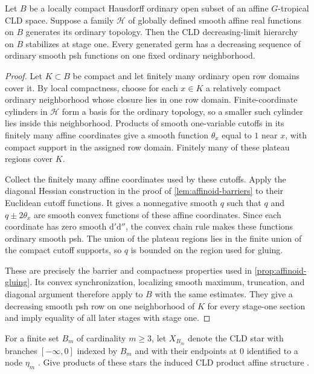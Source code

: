 \documentclass[11pt,a4paper]{amsart}
\begin{document}
\begin{proposition}
\label{prop:affine-coordinate-criterion}
Let $B$ be a locally compact Hausdorff ordinary open subset of an affine $G$-tropical CLD space. Suppose a family $\mathscr{H}$ of globally defined smooth affine real functions on $B$ generates its ordinary topology. Then the CLD decreasing-limit hierarchy on $B$ stabilizes at stage one. Every generated germ has a decreasing sequence of ordinary smooth psh functions on one fixed ordinary neighborhood.
\end{proposition}

\begin{proof}
Let $K\subset B$ be compact and let finitely many ordinary open row domains cover it. By local compactness, choose for each $x\in K$ a relatively compact ordinary neighborhood whose closure lies in one row domain. Finite-coordinate cylinders in $\mathscr{H}$ form a basis for the ordinary topology, so a smaller such cylinder lies inside this neighborhood. Products of smooth one-variable cutoffs in its finitely many affine coordinates give a smooth function $\theta_x$ equal to $1$ near $x$, with compact support in the assigned row domain. Finitely many of these plateau regions cover $K$.

Collect the finitely many affine coordinates used by these cutoffs. Apply the diagonal Hessian construction in the proof of \cref{lem:affinoid-barriers} to their Euclidean cutoff functions. It gives a nonnegative smooth $q$ such that $q$ and $q\pm2\theta_x$ are smooth convex functions of these affine coordinates. Since each coordinate has zero smooth $\mathrm{d}'\mathrm{d}''$, the convex chain rule makes these functions ordinary smooth psh. The union of the plateau regions lies in the finite union of the compact cutoff supports, so $q$ is bounded on the region used for gluing.

These are precisely the barrier and compactness properties used in \cref{prop:affinoid-gluing}. Its convex synchronization, localizing smooth maximum, truncation, and diagonal argument therefore apply to $B$ with the same estimates. They give a decreasing smooth psh row on one neighborhood of $K$ for every stage-one section and imply equality of all later stages with stage one.
\end{proof}

For a finite set $B_m$ of cardinality $m\geq3$, let $X_{B_m}$ denote the CLD star with branches $[-\infty,0]$ indexed by $B_m$ and with their endpoints at $0$ identified to a node $\eta_m$ \cite[\S6.7.3]{CLD12}. Give products of these stars the induced CLD product affine structure \cite[\S\S6.1.3 and~9.1]{CLD12}.
\end{document}
